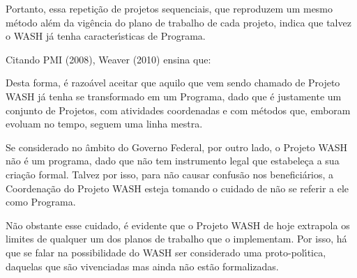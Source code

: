 \documentclass[
12pt,		%
openright,	%
twoside,  %
a4paper,			%
chapter=TITLE,		%
english,			%
french,				%
spanish,			%
brazil				%
]{USPSC-classe/USPSC}
\begin{document}
Portanto, essa repeti\c{c}\~ao de projetos sequenciais, que reproduzem um mesmo m\'etodo al\'em da vig\^encia do plano de trabalho de cada projeto, indica que talvez o WASH j\'a tenha caracter\'{\i}sticas de Programa.










Citando  PMI (2008), Weaver (2010) ensina que:











\noindent\begin{center}\mbox{\centering{}}\end{center}


Desta forma, \'e razo\'avel aceitar que aquilo que vem sendo chamado de Projeto WASH j\'a tenha se transformado em um Programa, dado que \'e justamente um conjunto de Projetos, com atividades coordenadas e com m\'etodos que, emboram evoluam no tempo, seguem uma linha mestra.










Se considerado no \^ambito do Governo Federal, por outro lado, o Projeto WASH n\~ao \'e um programa, dado que n\~ao tem instrumento legal que estabele\c{c}a a sua cria\c{c}\~ao formal. Talvez por isso, para n\~ao causar confus\~ao nos benefici\'arios, a Coordena\c{c}\~ao do Projeto WASH esteja tomando o cuidado de n\~ao se referir a ele como Programa.










N\~ao obstante esse cuidado, \'e evidente que o Projeto WASH de hoje extrapola os limites de qualquer um dos planos de trabalho que o implementam. Por isso, h\'a que se falar na possibilidade do WASH ser considerado uma proto-pol\'{\i}tica, daquelas que s\~ao vivenciadas mas ainda n\~ao est\~ao formalizadas.
\end{document}
